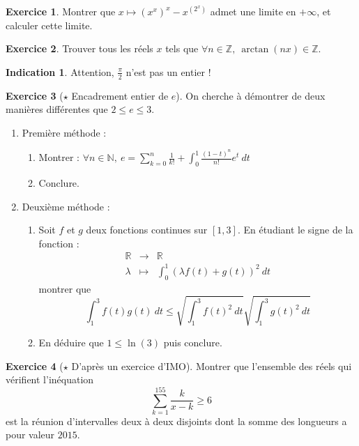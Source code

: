 \documentclass[french]{book}
\newcommand{\N}{\mathbb{N}}
\newcommand{\Z}{\mathbb{Z}}
\newcommand{\R}{\mathbb{R}}
\theoremstyle{definition}
\newtheorem{ex}{Exercice}[chapter]
\theoremstyle{theorem}
\newtheorem*{ind}{Indication}
\theoremstyle{remark}
\begin{document}
\begin{ex}
	Montrer que $x\mapsto (x^x)^x-x^{(2^x)}$ admet une limite en $+\infty$, et calculer cette limite.
\end{ex}

\begin{ex}
	Trouver tous les réels $x$ tels que $\forall n\in\Z,\ \arctan(nx)\in\Z$.
\end{ex}

\begin{ind}
	Attention, $\displaystyle\frac{\pi}{2}$ n'est pas un entier !
\end{ind}

\begin{ex}[$\star$ Encadrement entier de $e$]
	On cherche à démontrer de deux manières différentes que $2\leqslant e\leqslant 3$.
	\begin{enumerate}
		\item Première méthode :
		\begin{enumerate}[label=\alph*.]
			\item Montrer : $\forall n\in\N,\ e=\displaystyle\sum_{k=0}^{n}\frac{1}{k!}+\int_{0}^{1}\frac{(1-t)^n}{n!}e^t\ dt$
			\item Conclure.
		\end{enumerate}
		\item Deuxième méthode :
		\begin{enumerate}[label=\alph*.]
			\item Soit $f$ et $g$ deux fonctions continues sur $[1,3]$. En étudiant le signe de la fonction : $$\begin{array}{rcl}
				\R&\longrightarrow&\R\\
				\lambda&\longmapsto&\displaystyle\int_{0}^{1}\left(\lambda f(t)+g(t)\right)^2\ dt
			\end{array}$$ montrer que $$\int_{1}^{3}f(t)g(t)\ dt\leqslant\sqrt{\int_{1}^{3}f(t)^2\ dt}\sqrt{\int_{1}^{3}g(t)^2\ dt}$$
			\item En déduire que $1\leqslant\ln(3)$ puis conclure.
		\end{enumerate}
	\end{enumerate}
\end{ex}

\begin{ex}[$\star$ D'après un exercice d'IMO]
	Montrer que l'ensemble des réels qui vérifient l'inéquation $$\sum_{k=1}^{155}\frac{k}{x-k}\geqslant 6$$ est la réunion d'intervalles deux à deux disjoints dont la somme des longueurs a pour valeur $2015$.
\end{ex}
\end{document}
